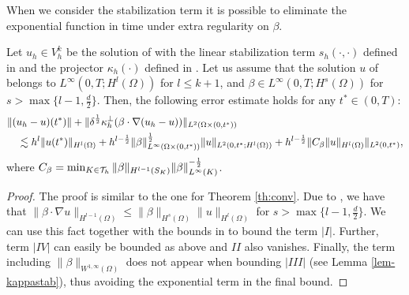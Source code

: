 
When we consider the stabilization term  it is possible to eliminate the exponential function in time under extra regularity on $\beta$.

\begin{theorem}[Convergence]\label{th:conv2}
Let $u_h \in V_h^k$ be the solution of  with the linear stabilization term $s_h(\cdot,\cdot)$ defined in   and the projector $\kappa_h(\cdot)$ defined in . Let us assume that the solution $u$ of  belongs to $L^\infty(0,T;H^l(\Omega))$ for $l \leq k+1$, and $\beta\in L^\infty(0,T;{H}^s(\Omega))$ for $s>\max \{ l -1, \frac{d}{2}\}$. Then, the following error estimate holds for any $t^* \in (0,T)$:
\begin{align*}
 &\|(u_h-u)(t^*)\| + \| \delta^\frac{1}{2}  \kappa_h^\perp (\beta \cdot\nabla  (u_h-u)) \|_{L^2(\Omega \times (0,t^*))}   \\
&\quad \lesssim    h^{l} \|u(t^*)\|_{H^l(\Omega)}  +  h^{l-\frac{1}{2}} \|\beta\|_{L^{\infty}(\Omega \times (0,t^*))}^{\frac{1}{2}} \|u\|_{L^2(0,t^*;H^l(\Omega))}
+ h^{l-\frac{1}{2}}  \| C_\beta \|u\|_{H^l(\Omega)} \|_{L^2(0,t^*)},
\end{align*}
where $C_\beta=\min_{K \in \mathcal{T}_h} \|\beta\|_{H^{l-1}(S_K)}\|\beta\|^{-\frac{1}{2}}_{L^\infty(K)}$.
\end{theorem}
\begin{proof}
The proof is similar to the one for Theorem \ref{th:conv}. Due to \cite[Th. $1.4.4.2$]{grisvard2011elliptic}, we have that $\| \beta \cdot \nabla u \|_{H^{l-1}(\Omega)} \leq \| \beta \|_{H^s(\Omega)}  \|u\|_{H^l(\Omega)}$ for $s > \max \{ l -1, \frac{d}{2}\}$. We can use this fact together with the bounds in  to bound the term $|I|$. Further, term $|IV|$ can easily be bounded as above and $II$ also vanishes. Finally, the term including $\|\beta\|_{W^{1,\infty}(\Omega)}$ does not appear when bounding $|III|$ (see Lemma \ref{lem-kappastab}), thus avoiding the exponential term in the final bound.
\end{proof}
